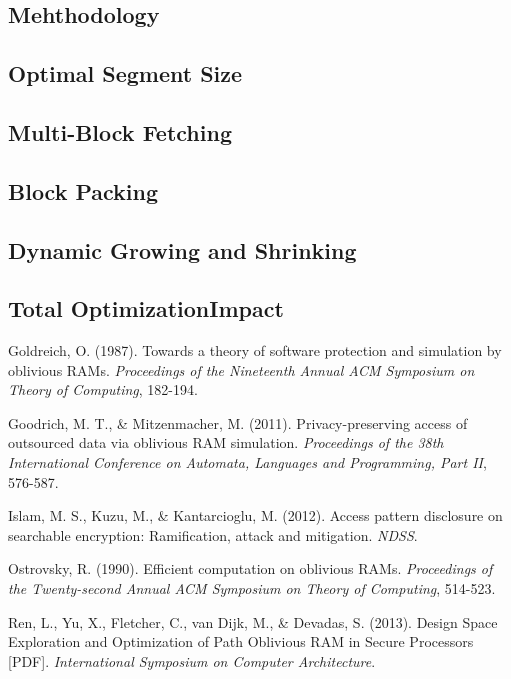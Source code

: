 \documentclass{article}
\begin{document}
\begin{multicols}{2}
\subsection{Mehthodology}

\subsection{Optimal Segment Size}

\subsection{Multi-Block Fetching}

\subsection{Block Packing}

\subsection{Dynamic Growing and Shrinking}

\subsection{Total OptimizationImpact}


\begin{thebibliography}{9}

 Goldreich, O. (1987). Towards a theory of software protection and simulation by oblivious RAMs. {\em Proceedings of the Nineteenth Annual ACM Symposium on Theory of Computing}, 182-194.

 Goodrich, M. T., \& Mitzenmacher, M. (2011). Privacy-preserving access of outsourced data via oblivious RAM simulation. {\em Proceedings of the 38th International Conference on Automata, Languages and Programming, Part II}, 576-587.

 Islam, M. S., Kuzu, M., \& Kantarcioglu, M. (2012). Access pattern disclosure on searchable encryption: Ramification, attack and mitigation. {\em NDSS}.

 Ostrovsky, R. (1990). Efficient computation on oblivious RAMs. {\em Proceedings of the Twenty-second Annual ACM Symposium on Theory of Computing}, 514-523.

 Ren, L., Yu, X., Fletcher, C., van Dijk, M., \& Devadas, S. (2013). Design Space Exploration and Optimization of Path Oblivious RAM in Secure Processors [PDF]. {\em International Symposium on Computer Architecture}.


\end{thebibliography}
\end{multicols}
\end{document}

